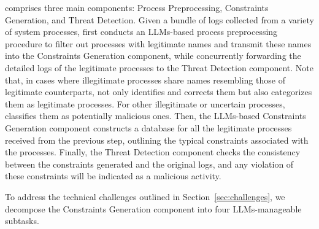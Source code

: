 \tool comprises three main components: Process Preprocessing, Constraints Generation, and Threat Detection.
Given a bundle of logs collected from a variety of system processes, \tool first conducts an LLMs-based process preprocessing procedure to filter out processes with legitimate names and transmit these names into the Constraints Generation component, while concurrently forwarding the detailed logs of the legitimate processes to the Threat Detection component. Note that, in cases where illegitimate processes share names resembling those of legitimate counterparts, \tool not only identifies and corrects them but also categorizes them as legitimate processes. For other illegitimate or uncertain processes, \tool classifies them as potentially malicious ones. Then, the LLMs-based Constraints Generation component constructs a database for all the legitimate processes received from the previous step, outlining the typical constraints associated with the processes. Finally, the Threat Detection component checks the consistency between the constraints generated and the original logs, and any violation of these constraints will be indicated as a malicious activity.

To address the technical challenges outlined in Section~\ref{sec:challenges}, we decompose the Constraints Generation component into four LLMs-manageable subtasks.




